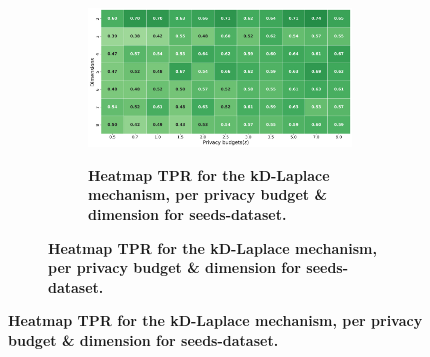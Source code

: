 \newpage
\begin{figure}[H]
    \centering
    \begin{subfigure}[b]{0.9\textwidth}
        \begin{subfigure}[c]{1\textwidth}
            \caption{\textbf{Heatmap TPR for the kD-Laplace mechanism, per privacy budget \& dimension for seeds-dataset.}}
            \includegraphics[width=1\textwidth]{Results/kd-laplace/kd-Laplace/seeds-dataset/tpr.png}
            \label{fig:privacy_tpr_seeds-dataset_adversial_advantage_kd-laplace}
        \end{subfigure}
        \vfill %


\end{subfigure}
\end{figure}
